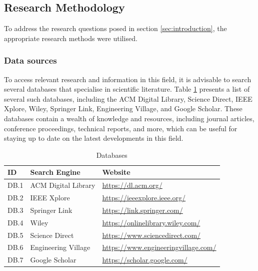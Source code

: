\documentclass[conference]{IEEEtran}
\begin{document}
\subsection{Research Methodology} \label{sub:research-methodology}

To address the research questions posed in section \ref{sec:introduction}, the
appropriate research methods were utilised.

\subsubsection{Data sources}

To access relevant research and information in this field, it is advisable to
search several databases that specialise in scientific literature. Table
\ref{tab:databases} presents a list of several such databases, including the
ACM Digital Library, Science Direct, IEEE Xplore, Wiley, Springer Link,
Engineering Village, and Google Scholar. These databases contain a wealth of
knowledge and resources, including journal articles, conference proceedings,
technical reports, and more, which can be useful for staying up to date on the
latest developments in this field.

\begin{table}[!htb] \caption{Databases} \label{tab:databases}
  \begin{center}
    \begin{tabular}[c]{l|l|l} \textbf{ID} & \textbf{Search Engine} &
      \textbf{Website} \\
      \hline DB.1 & ACM Digital Library & \url{https://dl.acm.org/} \\
      \hline DB.2 & IEEE Xplore & \url{https://ieeexplore.ieee.org/} \\
      \hline DB.3 & Springer Link & \url{https://link.springer.com/} \\
      \hline DB.4 & Wiley & \url{https://onlinelibrary.wiley.com/} \\
      \hline DB.5 & Science Direct & \url{https://www.sciencedirect.com/} \\
      \hline DB.6 & Engineering Village &
      \url{https://www.engineeringvillage.com/} \\
      \hline DB.7 & Google Scholar & \url{https://scholar.google.com/} \\
    \end{tabular}
  \end{center}
\end{table}
\end{document}

